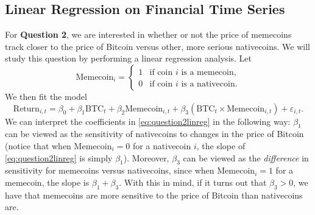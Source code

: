 \documentclass[12pt]{article}
\begin{document}
	\subsection{Linear Regression on Financial Time Series}
	For \textbf{Question 2}, we are interested in whether or not the price of memecoins track closer to the price of Bitcoin versus other, more serious nativecoins. We will study this question by performing a linear regression analysis. Let 
		\begin{equation*}
			\mathrm{Memecoin}_i = \begin{cases}1 & \text{if coin } i \text{ is a memecoin}, \\ 0 & \text{if coin } i \text{ is a nativecoin}.\end{cases}
		\end{equation*}
	We then fit the model 
	\begin{equation}
		\label{eq:question2linreg}
		\mathrm{Return}_{i,t} = \beta_0 + \beta_1 \mathrm{BTC}_t + \beta_2 \mathrm{Memecoin}_{i,t} + \beta_3 (\mathrm{BTC}_t \times \mathrm{Memecoin}_{i,t}) + \varepsilon_{i,t}. 
	\end{equation}
	We can interpret the coefficients in \autoref{eq:question2linreg} in the following way: $\beta_1$ can be viewed as the sensitivity of nativecoins to changes in the price of Bitcoin (notice that when $\mathrm{Memecoin}_i = 0$ for a nativecoin $i$, the slope of \autoref{eq:question2linreg} is simply $\beta_1$). Moreover, $\beta_3$ can be viewed as the \textit{difference} in sensitivity for memecoins versus nativecoins, since when $\mathrm{Memecoin}_i = 1$ for a memecoin, the slope is $\beta_1 + \beta_3$. With this in mind, if it turns out that $\beta_3 > 0$, we have that memecoins are more sensitive to the price of Bitcoin than nativecoins are. 
	
\end{document}
